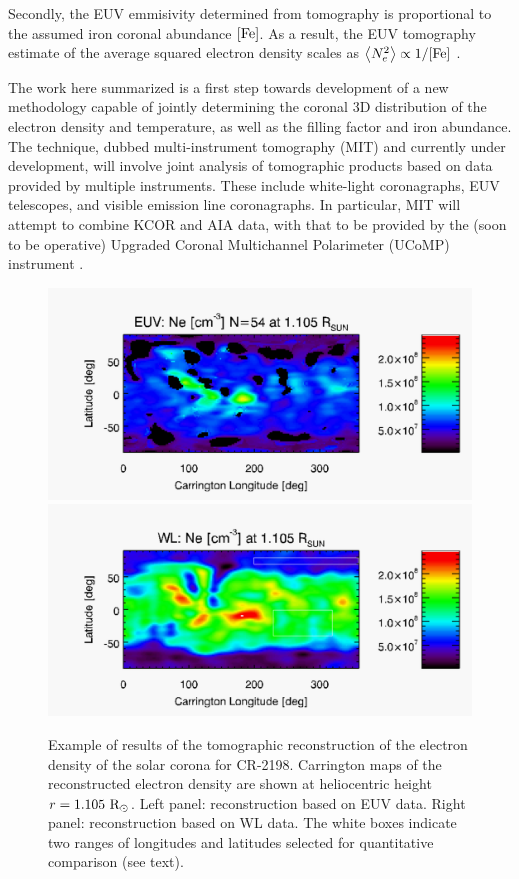 \documentclass[baaa]{baaa}
\def\AvgNE2{\left<N_e^2\right>}
\begin{document}
Secondly, the EUV emmisivity determined from tomography is proportional to the assumed iron coronal abundance $[\rm{Fe}]$. As a result, the EUV tomography estimate of the average squared electron density scales as $\AvgNE2 \propto 1/[\rm{Fe}]$ \citep{frazin_2009}.

The work here summarized is a first step towards development of a new methodology capable of jointly determining the coronal 3D distribution of the electron density and temperature, as well as the filling factor and iron abundance. The technique, dubbed multi-instrument tomography (MIT) and currently under development, will involve joint analysis of tomographic products based on data provided by multiple instruments. These include white-light coronagraphs, EUV telescopes, and visible emission line coronagraphs. In particular, MIT will attempt to combine KCOR and AIA data, with that to be provided by the (soon to be operative) Upgraded Coronal Multichannel Polarimeter (UCoMP) instrument \citep{landi_2016}.


\begin{figure}[t]
  \centering
  \includegraphics[width=\columnwidth]{map_ne_aia_bloqueo109_n54.pdf}
  \includegraphics[width=\columnwidth]{map_ne_kcor.pdf}
  \caption{Example of results of the tomographic reconstruction of the electron density of the solar corona for CR-2198. Carrington maps of the reconstructed electron density are shown at heliocentric height $r=1.105~\rm{R}_\odot$. Left panel: reconstruction based on EUV data. Right panel: reconstruction based on WL data. The white boxes indicate two ranges of longitudes and latitudes selected for quantitative comparison (see text).}
  \label{fig_maps}
\end{figure}
\end{document}
